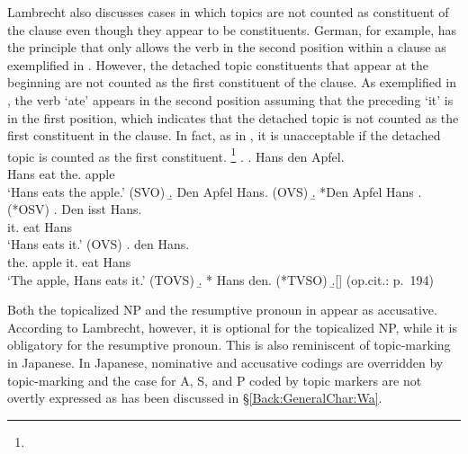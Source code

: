 Lambrecht also discusses cases in which
topics are not counted as constituent of the clause
even though they appear to be constituents.
German, for example, has the principle that only allows the verb in the second position within a clause as exemplified in \Next[a-d].
However, the detached topic constituents that appear at the beginning are not counted as the first constituent of the clause.
As exemplified in \Next[e],
the verb  `ate' appears in the second position assuming that the preceding  `it' is in the first position,
which indicates that
the detached topic  is not counted as the first constituent in the clause.
In fact, as in \Next[f],
it is unacceptable
if the detached topic  is counted as the first constituent.%
 \footnote{
 }
%
\ex.\label{Par:Subj:Ex:Ex:Apfel}
 \ag. Hans  den Apfel. \\
   Hans eat the. apple \\
   `Hans eats the apple.' \hfill{(SVO)}
 \b. Den Apfel  Hans. \hfill{(OVS)}
 \b. *Den Apfel Hans .\hfill{(*OSV)}
 \bg. Den isst Hans. \\
   it. eat Hans \\
   `Hans eats it.' \hfill{(OVS)}
 \bg.   den  Hans. \\
   the. apple it. eat Hans \\
   `The apple, Hans eats it.'  \hfill{(TOVS)}
 \b. *   Hans den. \hfill{(*TVSO)}
 \b.[] \hfill{(op.cit.: p.~194)}

Both the topicalized NP  and the resumptive pronoun  in \Last[e] appear as accusative.
According to Lambrecht, however,
it is optional for the topicalized NP,
while it is obligatory for the resumptive pronoun.
This is also reminiscent of topic-marking in Japanese.
In Japanese,
nominative and accusative codings are overridden by topic-marking
and the case for A, S, and P coded by topic markers are not overtly expressed
as has been discussed in \S \ref{Back:GeneralChar:Wa}.


